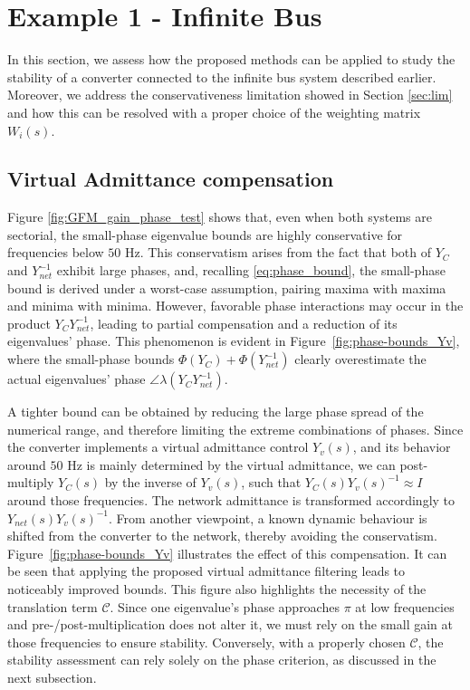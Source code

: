 \section{Example 1 - Infinite Bus}
In this section, we assess how the proposed methods can be applied to study the stability of a converter connected to the infinite bus system described earlier. Moreover, we address the conservativeness limitation showed in Section \ref{sec:lim} and how this can be resolved with a proper choice of the weighting matrix $W_i(s)$.

\subsection{Virtual Admittance compensation}
Figure \ref{fig:GFM_gain_phase_test} shows that, even when both systems are sectorial, the small-phase eigenvalue bounds are highly conservative for frequencies below $50$ Hz. This conservatism arises from the fact that both of $Y_C$ and $Y^{-1}_{net}$ exhibit large phases, and, recalling \eqref{eq:phase_bound}, the small-phase bound is derived under a worst-case assumption, pairing maxima with maxima and minima with minima. However, favorable phase interactions may occur in the product $Y_CY^{-1}_{net}$, leading to partial compensation and a reduction of its eigenvalues' phase. This phenomenon is evident in Figure~\ref{fig:phase-bounds_Yv}, where the small-phase bounds $\Phi(Y_C)+\Phi(Y_{net}^{-1})$ clearly overestimate the actual eigenvalues' phase $\angle\lambda(Y_CY_{net}^{-1})$.

A tighter bound can be obtained by reducing the large phase spread of the numerical range, and therefore limiting the extreme combinations of phases. Since the converter implements a virtual admittance control $Y_v(s)$, and its behavior around $50$ Hz is mainly determined by the virtual admittance, we can post-multiply $Y_C(s)$ by the inverse of $Y_{v}(s)$, such that $Y_{C}(s)Y_{v}(s)^{-1}\approx I$ around those frequencies. The network admittance is transformed accordingly to $Y_{net}(s)Y_{v}(s)^{-1}$.
From another viewpoint, a known dynamic behaviour is shifted from the converter to the network, thereby avoiding the conservatism.
Figure~\ref{fig:phase-bounds_Yv} illustrates the effect of this compensation. It can be seen that applying the proposed virtual admittance filtering leads to noticeably improved bounds.
This figure also highlights the necessity of the translation term $\mathcal{C}$. Since one eigenvalue’s phase approaches $\pi$ at low frequencies and pre-/post-multiplication does not alter it, we must rely on the small gain at those frequencies to ensure stability. Conversely, with a properly chosen $\mathcal{C}$, the stability assessment can rely solely on the phase criterion, as discussed in the next subsection.

